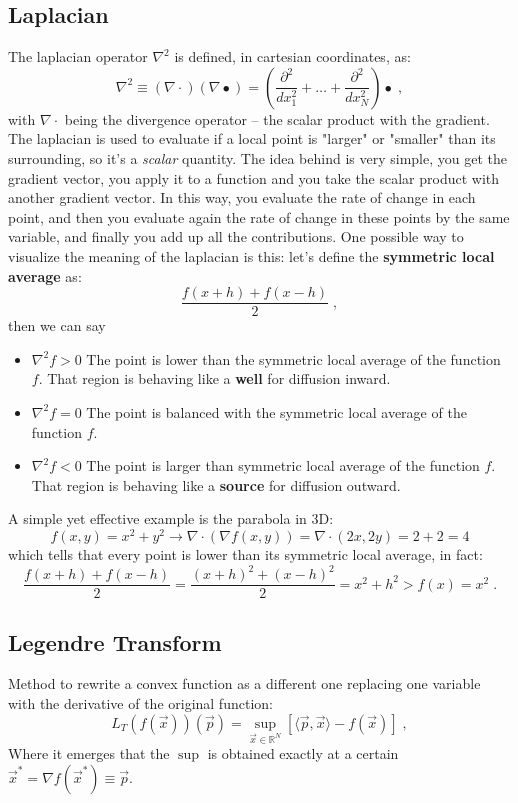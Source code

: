 \documentclass[12pt,a4paper]{article}
\begin{document}
\subsection{Laplacian}
The laplacian operator $\nabla^2$ is defined, in cartesian coordinates, as:
\begin{equation*}
	\nabla^2 \equiv (\nabla \cdot) (\nabla \bullet) = \left( \dfrac{\partial^2}{dx^2_1} + \dots + \dfrac{\partial^2}{dx^2_N}\right) \bullet\;,
\end{equation*}
with $\nabla \cdot$ being the divergence operator -- the scalar product with the gradient. The laplacian is used to evaluate if a local point is "larger" or "smaller" than its surrounding, so it's a \textit{scalar} quantity.
The idea behind is very simple, you get the gradient vector, you apply it to a function and you take the scalar product with another gradient vector. In this way, you evaluate the rate of change in each point, and then you evaluate again the rate of change in these points by the same variable, and finally you add up all the contributions.
One possible way to visualize the meaning of the laplacian is this: let's define the \textbf{symmetric local average} as:
$$
\dfrac{f(x+h)+f(x-h)}{2}\;,
$$
then we can say
\begin{itemize}
	\item $\nabla^2 f > 0$ The point is lower than the symmetric local average of the function $f$. That region is behaving like a \textbf{well} for diffusion inward.
	\item $\nabla^2 f = 0$ The point is balanced with the symmetric local average of the function $f$.
	\item $\nabla^2 f < 0$ The point is larger than symmetric local average of the function $f$. That region is behaving like a \textbf{source} for diffusion outward.
\end{itemize}
A simple yet effective example is the parabola in 3D:
$$
f(x,y) = x^2+y^2 \rightarrow \nabla \cdot (\nabla f(x,y)) = \nabla \cdot (2x,2y) = 2+2 = 4
$$
which tells that every point is lower than its symmetric local average, in fact:
$$
\dfrac{f(x+h)+f(x-h)}{2} = \dfrac{(x+h)^2+(x-h)^2}{2} = x^2+h^2>f(x)=x^2\;.
$$

\subsection{Legendre Transform}
Method to rewrite a convex function as a different one replacing one variable
with the derivative of the original function:
\begin{equation}
	L_T(f(\vec{x}))(\vec{p}) = \sup_{\vec{x}\in \mathbb{R}^N} \left[ \langle \vec{p},\vec{x} \rangle - f(\vec{x}) \right] \;,
\end{equation}
Where it emerges that the $\sup$ is obtained exactly at a certain $\vec{x}^*=\nabla f(\vec{x}^*)\equiv \vec{p}.$
\end{document}
